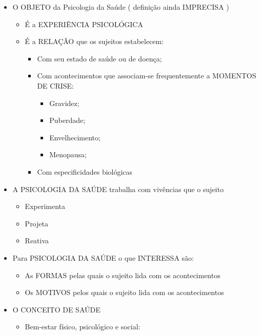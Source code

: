 \documentclass[
]{book}
\providecommand{\tightlist}{%
  \setlength{\itemsep}{0pt}\setlength{\parskip}{0pt}}
\begin{document}
\begin{itemize}
\tightlist
\item
  O OBJETO da Psicologia da Saúde ( definição ainda IMPRECISA )

  \begin{itemize}
  \tightlist
  \item
    É a EXPERIÊNCIA PSICOLÓGICA
  \item
    É a RELAÇÃO que os sujeitos estabelecem:

    \begin{itemize}
    \tightlist
    \item
      Com seu estado de saúde ou de doença;
    \item
      Com acontecimentos que associam-se frequentemente a MOMENTOS DE CRISE:

      \begin{itemize}
      \tightlist
      \item
        Gravidez;
      \item
        Puberdade;
      \item
        Envelhecimento;
      \item
        Menopausa;
      \end{itemize}
    \item
      Com especificidades biológicas
    \end{itemize}
  \end{itemize}
\item
  A PSICOLOGIA DA SAÚDE trabalha com vivências que o sujeito

  \begin{itemize}
  \tightlist
  \item
    Experimenta
  \item
    Projeta
  \item
    Reativa
  \end{itemize}
\item
  Para PSICOLOGIA DA SAÚDE o que INTERESSA são:

  \begin{itemize}
  \tightlist
  \item
    As FORMAS pelas quais o sujeito lida com os acontecimentos
  \item
    Os MOTIVOS pelos quais o sujeito lida com os acontecimentos
  \end{itemize}
\item
  O CONCEITO DE SAÚDE

  \begin{itemize}
  \tightlist
  \item
    Bem-estar físico, psicológico e social:


\end{itemize}
\end{itemize}
\end{document}
